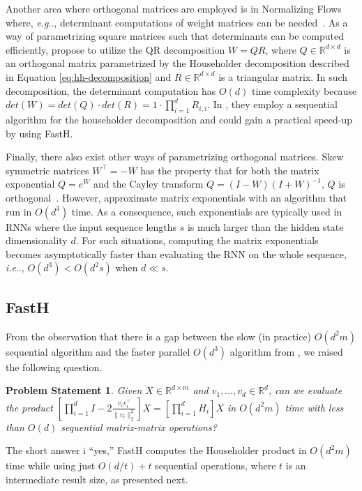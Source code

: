 \documentclass[11pt,a4paper,twoside,openright,final]{memoir}
\makeatletter
\newtheorem{problem}{Problem Statement}
\DeclareRobustCommand\onedot{\futurelet\@let@token\@onedot}
\def\@onedot{\ifx\@let@token.\else.\null\fi\xspace}
\def\eg{\emph{e.g}\onedot} \def\Eg{\emph{E.g}\onedot}
\def\ie{\emph{i.e}\onedot} \def\Ie{\emph{I.e}\onedot}
\makeatother
\begin{document}
Another area where orthogonal matrices are employed is in Normalizing Flows where, \eg, determinant computations of weight matrices can be needed~\cite{glow}.
As a way of parametrizing square matrices such that determinants can be computed efficiently, \citet{emerging} propose to utilize the QR decomposition $W = QR$, where $Q\in\mathbb{R}^{d\times d}$ is an orthogonal matrix parametrized by the Householder decomposition described in Equation \eqref{eq:hh-decomposition} and $R\in\mathbb{R}^{d\times d}$ is a triangular matrix.
In such decomposition, the determinant computation has $O(d)$ time complexity because $det(W) = det(Q) \cdot det(R) =1 \cdot  \prod_{i=1}^d R_{i,i}$. 
In \cite{emerging}, they employ a sequential algorithm for the householder decomposition and could gain a practical speed-up by using FastH. 

Finally, there also exist other ways of parametrizing orthogonal matrices.
Skew symmetric matrices $W^\intercal = -W$ has the property that for both the matrix exponential $Q = e^W$ and the Cayley transform $Q=(I-W)(I+W)^{-1}$, $Q$ is orthogonal~\cite{matrixexp1}. 
However, \citet{matrixexp1} approximate matrix exponentials with an algorithm that run in $O(d^3)$ time.  
As a consequence, such exponentials are typically used in RNNs where the input sequence lengths $s$ is much larger than the hidden state dimensionality $d$.
For such situations, computing the matrix exponentials becomes asymptotically faster than evaluating the RNN on the whole sequence, \ie, $O(d^3) < O(d^2s)$ when $d \ll s$.

\subsection{FastH}\label{sec:fasth}
From the observation that there is a gap between the slow (in practice) $O(d^2m)$ sequential algorithm and the faster parallel $O(d^3)$ algorithm from \cite{sequential}, we raised the following question.

\begin{problem}
    Given $X\in \mathbb{R}^{d\times m}$ and $v_1, ..., v_d \in \mathbb{R}^{d}$, can we evaluate the product $\left[ \prod_{i=1}^d I-2\frac{v_iv_i^\intercal}{\|v_i\|_2^2}\right]X = \left[\prod_{i=1}^d H_i\right]X$ in $O(d^2m)$ time with less than $O(d)$ sequential matrix-matrix operations?
\end{problem}

The short answer i ``yes,'' FastH computes the Householder product in $O(d^2m)$ time while using just $O(d/t) + t$ sequential operations, where $t$ is an intermediate result size, as presented next.
\end{document}
